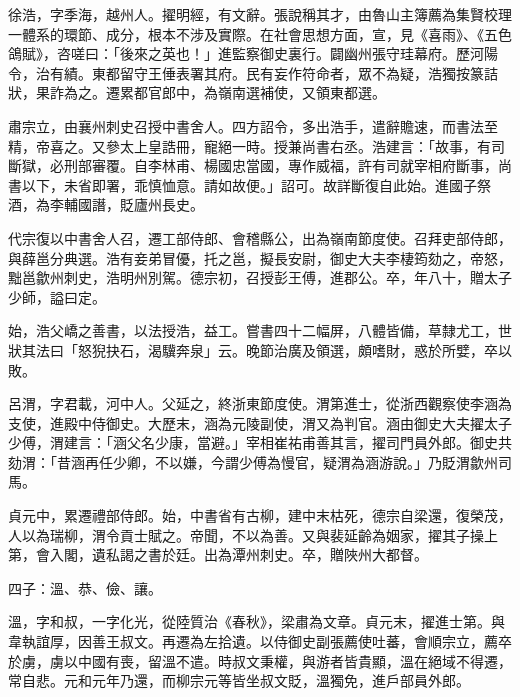 
\begin{pinyinscope}

 徐浩，字季海，越州人。擢明經，有文辭。張說稱其才，由魯山主簿薦為集賢校理一體系的環節、成分，根本不涉及實際。在社會思想方面，宣，見《喜雨》、《五色鴿賦》，咨嗟曰：「後來之英也！」進監察御史裏行。闢幽州張守珪幕府。歷河陽令，治有績。東都留守王倕表署其府。民有妄作符命者，眾不為疑，浩獨按篆詰狀，果詐為之。遷累都官郎中，為嶺南選補使，又領東都選。



 肅宗立，由襄州刺史召授中書舍人。四方詔令，多出浩手，遣辭贍速，而書法至精，帝喜之。又參太上皇誥冊，寵絕一時。授兼尚書右丞。浩建言：「故事，有司斷獄，必刑部審覆。自李林甫、楊國忠當國，專作威福，許有司就宰相府斷事，尚書以下，未省即署，乖慎恤意。請如故便。」詔可。故詳斷復自此始。進國子祭酒，為李輔國譖，貶廬州長史。



 代宗復以中書舍人召，遷工部侍郎、會稽縣公，出為嶺南節度使。召拜吏部侍郎，與薛邕分典選。浩有妾弟冒優，托之邕，擬長安尉，御史大夫李棲筠劾之，帝怒，黜邕歙州刺史，浩明州別駕。德宗初，召授彭王傅，進郡公。卒，年八十，贈太子少師，謚曰定。



 始，浩父嶠之善書，以法授浩，益工。嘗書四十二幅屏，八體皆備，草隸尤工，世狀其法曰「怒猊抉石，渴驥奔泉」云。晚節治廣及領選，頗嗜財，惑於所嬖，卒以敗。



 呂渭，字君載，河中人。父延之，終浙東節度使。渭第進士，從浙西觀察使李涵為支使，進殿中侍御史。大歷末，涵為元陵副使，渭又為判官。涵由御史大夫擢太子少傅，渭建言：「涵父名少康，當避。」宰相崔祐甫善其言，擢司門員外郎。御史共劾渭：「昔涵再任少卿，不以嫌，今謂少傅為慢官，疑渭為涵游說。」乃貶渭歙州司馬。



 貞元中，累遷禮部侍郎。始，中書省有古柳，建中末枯死，德宗自梁還，復榮茂，人以為瑞柳，渭令貢士賦之。帝聞，不以為善。又與裴延齡為姻家，擢其子操上第，會入閣，遺私謁之書於廷。出為潭州刺史。卒，贈陜州大都督。



 四子：溫、恭、儉、讓。



 溫，字和叔，一字化光，從陸質治《春秋》，梁肅為文章。貞元末，擢進士第。與韋執誼厚，因善王叔文。再遷為左拾遺。以侍御史副張薦使吐蕃，會順宗立，薦卒於虜，虜以中國有喪，留溫不遣。時叔文秉權，與游者皆貴顯，溫在絕域不得遷，常自悲。元和元年乃還，而柳宗元等皆坐叔文貶，溫獨免，進戶部員外郎。




\end{pinyinscope}
